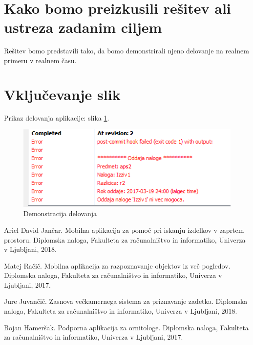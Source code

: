 \documentclass[11pt,a4paper]{article}
\begin{document}
\section{Kako bomo preizkusili rešitev ali ustreza zadanim ciljem}

Rešitev bomo predstavili tako, da bomo demonstrirali njeno delovanje na realnem primeru v realnem času.


\section{Vključevanje slik}

Prikaz delovanja aplikacije: slika \ref{fig:test}.


\begin{figure}[htb]
\begin{center}
\includegraphics[width=0.8\columnwidth]{Capture}
\end{center}
\caption{Demonstracija delovanja}
\label{fig:test}
\end{figure}


\begin{thebibliography}{9}

Ariel David Jančar.
Mobilna aplikacija za pomoč pri iskanju izdelkov v zaprtem prostoru.
Diplomska naloga, Fakulteta za računalništvo in informatiko, Univerza v Ljubljani, 2018.

Matej Račič.
Mobilna aplikacija za razpoznavanje objektov iz več pogledov.
Diplomska naloga, Fakulteta za računalništvo in informatiko, Univerza v Ljubljani, 2017.

Jure Juvančič.
Zasnova večkamernega sistema za priznavanje zadetka.
Diplomska naloga, Fakulteta za računalništvo in informatiko, Univerza v Ljubljani, 2018.

Bojan Hameršak.
Podporna aplikacija za ornitologe.
Diplomska naloga, Fakulteta za računalništvo in informatiko, Univerza v Ljubljani, 2017.

\end{thebibliography}
\end{document}
